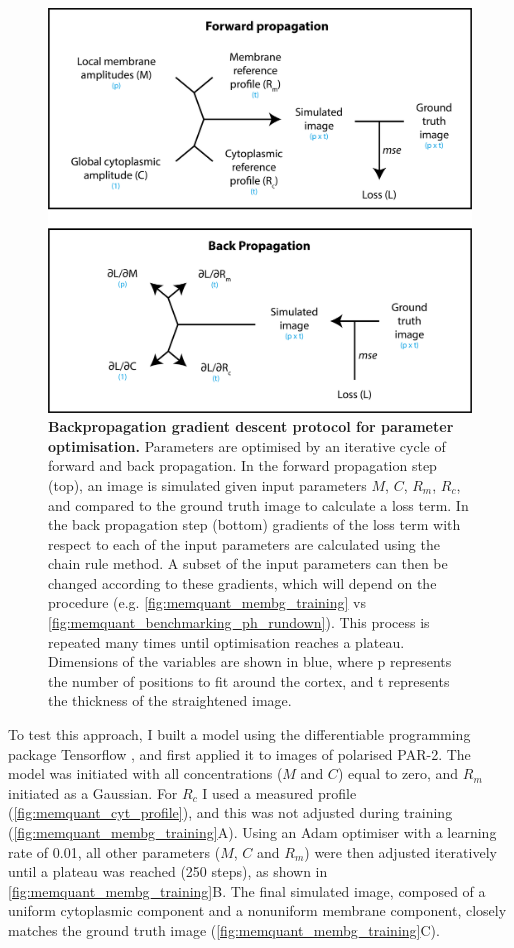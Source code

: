 \documentclass[12pt]{"article"}
\newcommand{\mycaption}[2]{\caption[#1]{\textbf{#1.} #2}}
\begin{document}
\begin{figure}
\includegraphics[scale=1.1]{memquant_forward_and_back_propagation}
\centering
\mycaption{Backpropagation gradient descent protocol for parameter optimisation}{Parameters are optimised by an iterative cycle of forward and back propagation. In the forward propagation step (top), an image is simulated given input parameters $M$, $C$, $R_m$, $R_c$, and compared to the ground truth image to calculate a loss term. In the back propagation step (bottom) gradients of the loss term with respect to each of the input parameters are calculated using the chain rule method. A subset of the input parameters can then be changed according to these gradients, which will depend on the procedure (e.g. \cref{fig:memquant_membg_training} vs \cref{fig:memquant_benchmarking_ph_rundown}). This process is repeated many times until optimisation reaches a plateau. Dimensions of the variables are shown in blue, where p represents the number of positions to fit around the cortex, and t represents the thickness of the straightened image.}
\label{fig:memquant_forward_and_back_propagation}
\end{figure}

To test this approach, I built a model using the differentiable programming package Tensorflow \citep{Abadi2016}, and first applied it to images of polarised PAR-2. The model was initiated with all concentrations ($M$ and $C$) equal to zero, and $R_m$ initiated as a Gaussian. For $R_c$ I used a measured profile (\cref{fig:memquant_cyt_profile}), and this was not adjusted during training (\cref{fig:memquant_membg_training}A). Using an Adam optimiser \citep{Kingma2015} with a learning rate of 0.01, all other parameters ($M$, $C$ and $R_m$) were then adjusted iteratively until a plateau was reached (250 steps), as shown in \cref{fig:memquant_membg_training}B. The final simulated image, composed of a uniform cytoplasmic component and a nonuniform membrane component, closely matches the ground truth image (\cref{fig:memquant_membg_training}C).\\
\end{document}
